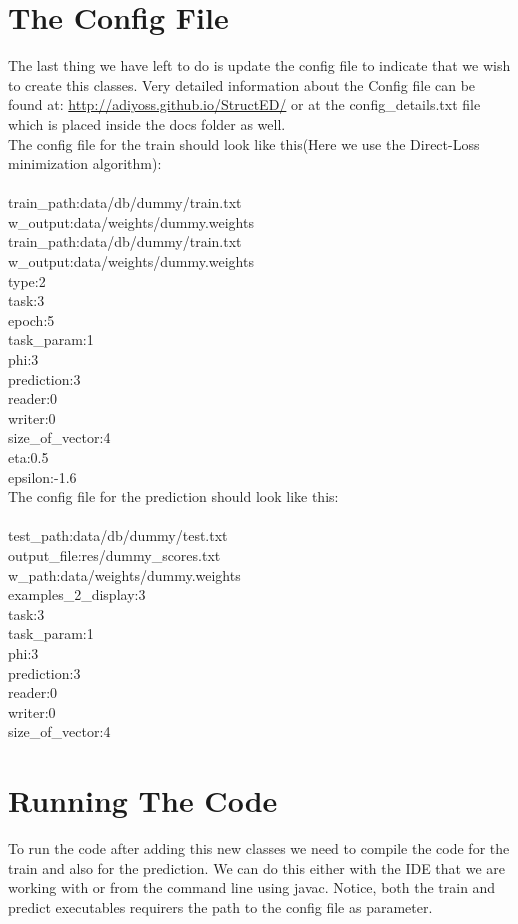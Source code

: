 \documentclass[11pt, oneside]{article}   	%
\begin{document}
\section{The Config File}
The last thing we have left to do is update the config file to indicate that we wish to create this classes.
Very detailed information about the Config file can be found at: \href{http://adiyoss.github.io/StructED/}{http://adiyoss.github.io/StructED/} or at the config\_details.txt file which is placed inside the docs folder as well.\\
The config file for the train should look like this(Here we use the Direct-Loss minimization algorithm): \\ \\
train\_path:data/db/dummy/train.txt \\ 
w\_output:data/weights/dummy.weights\\
train\_path:data/db/dummy/train.txt\\
w\_output:data/weights/dummy.weights\\
type:2\\
task:3\\
epoch:5\\
task\_param:1\\
phi:3\\
prediction:3\\
reader:0\\
writer:0\\
size\_of\_vector:4\\
eta:0.5\\
epsilon:-1.6\\
The config file for the prediction should look like this: \\ \\
test\_path:data/db/dummy/test.txt \\
output\_file:res/dummy\_scores.txt \\
w\_path:data/weights/dummy.weights\\
examples\_2\_display:3\\
task:3\\
task\_param:1\\
phi:3\\
prediction:3\\
reader:0\\
writer:0\\
size\_of\_vector:4\\

\section{Running The Code}
To run the code after adding this new classes we need to compile the code for the train and also for the prediction. We can do this either with the IDE that we are working with or from the command line using javac.
Notice, both the train and predict executables requirers the path to the config file as parameter.
\end{document}
